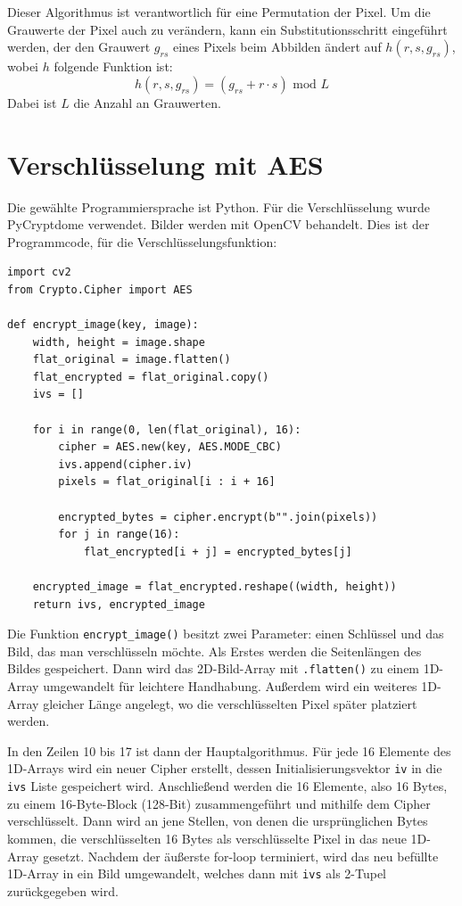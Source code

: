 Dieser Algorithmus ist verantwortlich für eine Permutation der Pixel. Um die Grauwerte der Pixel auch zu verändern, kann ein Substitutionsschritt
eingeführt werden, der den Grauwert $g_{rs}$ eines Pixels beim Abbilden ändert auf $h(r, s, g_{rs})$, wobei $h$ folgende Funktion ist:
$$h(r, s, g_{rs}) = (g_{rs} + r \cdot s) \text{ mod } L$$
Dabei ist $L$ die Anzahl an Grauwerten.
\cite{chaos}

\section{Verschlüsselung mit AES}
Die gewählte Programmiersprache ist Python. Für die Verschlüsselung wurde PyCryptdome verwendet.
Bilder werden mit OpenCV behandelt.
Dies ist der Programmcode, für die Verschlüsselungsfunktion:
\begin{lstlisting}
import cv2
from Crypto.Cipher import AES

def encrypt_image(key, image):
    width, height = image.shape
    flat_original = image.flatten()
    flat_encrypted = flat_original.copy()
    ivs = []

    for i in range(0, len(flat_original), 16):
        cipher = AES.new(key, AES.MODE_CBC)
        ivs.append(cipher.iv)
        pixels = flat_original[i : i + 16]

        encrypted_bytes = cipher.encrypt(b"".join(pixels))
        for j in range(16):
            flat_encrypted[i + j] = encrypted_bytes[j]

    encrypted_image = flat_encrypted.reshape((width, height))
    return ivs, encrypted_image
\end{lstlisting}
Die Funktion \lstinline{encrypt_image()} besitzt zwei Parameter: einen Schlüssel und das Bild,
das man verschlüsseln möchte. Als Erstes werden die Seitenlängen des Bildes gespeichert. Dann wird das 2D-Bild-Array
mit \lstinline{.flatten()} zu einem 1D-Array umgewandelt für leichtere Handhabung. Außerdem wird ein weiteres 1D-Array
gleicher Länge angelegt, wo die verschlüsselten Pixel später platziert werden.

In den Zeilen 10 bis 17 ist dann der Hauptalgorithmus. Für jede 16 Elemente des 1D-Arrays wird ein neuer Cipher erstellt,
dessen Initialisierungsvektor \lstinline{iv} in die \lstinline{ivs} Liste gespeichert wird. Anschließend werden die 16 Elemente,
also 16 Bytes, zu einem 16-Byte-Block (128-Bit) zusammengeführt und mithilfe dem Cipher verschlüsselt.
Dann wird an jene Stellen, von denen die ursprünglichen Bytes kommen, die verschlüsselten
16 Bytes als verschlüsselte Pixel in das neue 1D-Array gesetzt. Nachdem der äußerste for-loop terminiert, wird das neu befüllte 1D-Array in ein
Bild umgewandelt, welches dann mit \lstinline{ivs} als 2-Tupel zurückgegeben wird.

